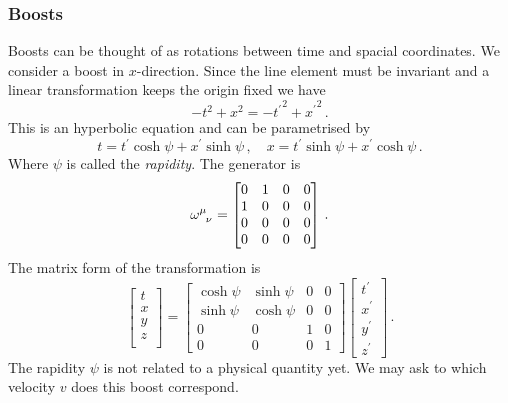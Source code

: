 \subsubsection*{Boosts}
Boosts can be thought of as rotations between time and spacial coordinates. We
consider a boost in $x$-direction. Since the line element must be invariant and
a linear transformation keeps the origin fixed we have
\begin{equation}
    -t^2+x^2=-{t^\prime}^2+{x^\prime}^2\, .
\end{equation}
This is an hyperbolic equation and can be parametrised by
\begin{equation}
    t = t^\prime\cosh\psi+x^\prime\sinh\psi\,, \quad x =
    t^\prime\sinh\psi+x^\prime\cosh\psi\, .
\end{equation}
Where $\psi$ is called the \emph{rapidity}.
The generator is
\begin{equation}
    \tensor{\omega}{^\mu_\nu}
    =
    \begin{bmatrix}
        0&1 & 0&0\\
        1&0 &0&0\\
        0&0&0 &0\\
        0&0 &0 &0
    \end{bmatrix}\,.
\end{equation}
The matrix form of the transformation is
\begin{equation}
    \begin{bmatrix}
        t\\
        x\\
        y\\
        z\\
    \end{bmatrix}=
    \begin{bmatrix}
        \cosh\psi&\sinh\psi & 0&0\\
        \sinh\psi&\cosh\psi &0&0\\
        0&0&1 &0\\
        0&0 &0 &1
    \end{bmatrix}
    \begin{bmatrix}
        t^\prime\\
        x^\prime\\
        y^\prime\\
        z^\prime
    \end{bmatrix}\, .
\end{equation}
The rapidity $\psi$ is not related to a physical quantity yet. We may ask to
which velocity $v$ does this boost correspond.
